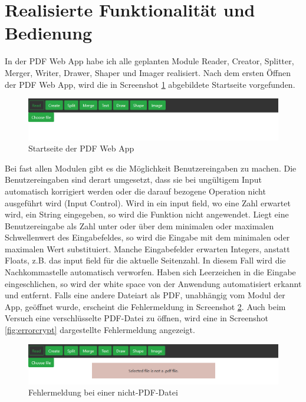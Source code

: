\section{Realisierte Funktionalität und Bedienung}
In der PDF Web App habe ich alle geplanten Module Reader, Creator, Splitter, Merger, Writer, Drawer, Shaper und Imager realisiert. Nach dem ersten Öffnen der PDF Web App, wird die in Screenshot \ref{fig:start} abgebildete Startseite vorgefunden.

\begin{figure}[!htbp]
	\centering
	\includegraphics[width=1\textwidth]{"images/startseite.png"}
	\caption{Startseite der PDF Web App}
	\label{fig:start}
\end{figure}

Bei fast allen Modulen gibt es die Möglichkeit Benutzereingaben zu machen. Die Benutzereingaben sind derart umgesetzt, dass sie bei ungültigem Input automatisch korrigiert werden oder die darauf bezogene Operation nicht ausgeführt wird (Input Control). Wird in ein input field, wo eine Zahl erwartet wird, ein String eingegeben, so wird die Funktion nicht angewendet. Liegt eine Benutzereingabe als Zahl unter oder über dem minimalen oder maximalen Schwellenwert des Eingabefeldes, so wird die Eingabe mit dem minimalen oder maximalen Wert substituiert. Manche Eingabefelder erwarten Integers, anstatt Floats, z.B. das input field für die aktuelle Seitenzahl. In diesem Fall wird die Nachkommastelle automatisch verworfen. Haben sich Leerzeichen in die Eingabe eingeschlichen, so wird der white space von der Anwendung automatisiert erkannt und entfernt. Falls eine andere Dateiart als PDF, unabhängig vom Modul der App, geöffnet wurde, erscheint die Fehlermeldung in Screenshot \ref{fig:errorfile}. Auch beim Versuch eine verschlüsselte PDF-Datei zu öffnen, wird eine in Screenshot \ref{fig:errorcrypt} dargestellte Fehlermeldung angezeigt.

\begin{figure}[!htbp]
	\centering
	\includegraphics[width=1\textwidth]{"images/errorfile.png"}
	\caption{Fehlermeldung bei einer nicht-PDF-Datei}
	\label{fig:errorfile}
\end{figure}

